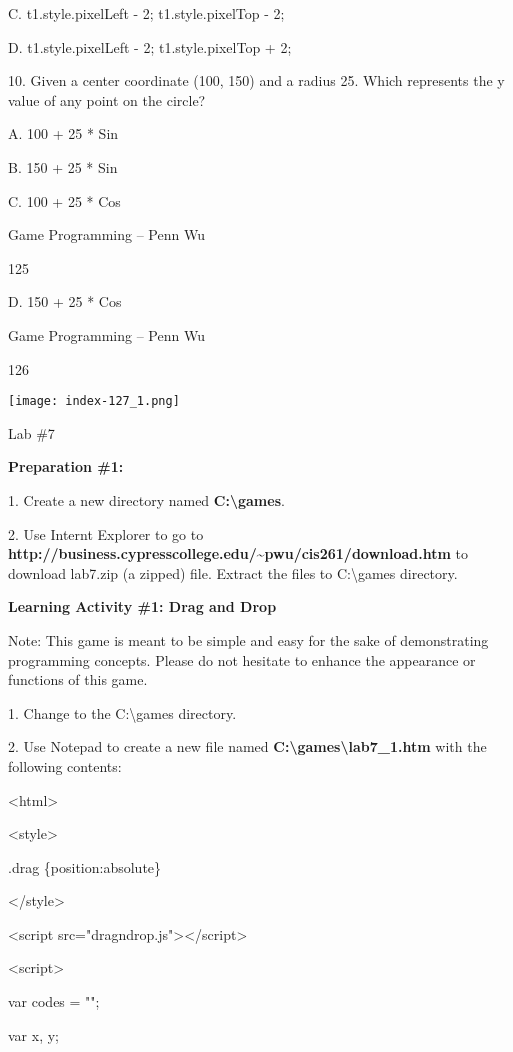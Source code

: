 \documentclass[
]{article}
\begin{document}
C. t1.style.pixelLeft - 2; t1.style.pixelTop - 2;

D. t1.style.pixelLeft - 2; t1.style.pixelTop + 2;

10. Given a center coordinate (100, 150) and a radius 25. Which
represents the y value of any point on the circle?

A. 100 + 25 * Sin

B. 150 + 25 * Sin

C. 100 + 25 * Cos

Game Programming -- Penn Wu

125

\protect\hypertarget{index_split_008.htmlux5cux23p126}{}{}D. 150 + 25 *
Cos

Game Programming -- Penn Wu

126

\protect\hypertarget{index_split_008.htmlux5cux23p127}{}{}\texttt{[image: index-127\_1.png]}

Lab \#7

\textbf{Preparation \#1:}

1. Create a new directory named \textbf{C:\textbackslash games}.

2. Use Internt Explorer to go to
\textbf{http://business.cypresscollege.edu/\textasciitilde pwu/cis261/download.htm}
to download lab7.zip (a zipped) file. Extract the files to
C:\textbackslash games directory.

\textbf{Learning Activity \#1: Drag and Drop}

Note: This game is meant to be simple and easy for the sake of
demonstrating programming concepts. Please do not hesitate to enhance
the appearance or functions of this game.

1. Change to the C:\textbackslash games directory.

2. Use Notepad to create a new file named
\textbf{C:\textbackslash games\textbackslash lab7\_1.htm} with the
following contents:

\textless html\textgreater{}

\textless style\textgreater{}

.drag \{position:absolute\}

\textless/style\textgreater{}

\textless script
src="dragndrop.js"\textgreater\textless/script\textgreater{}

\textless script\textgreater{}

var codes = "";

var x, y;
\end{document}
